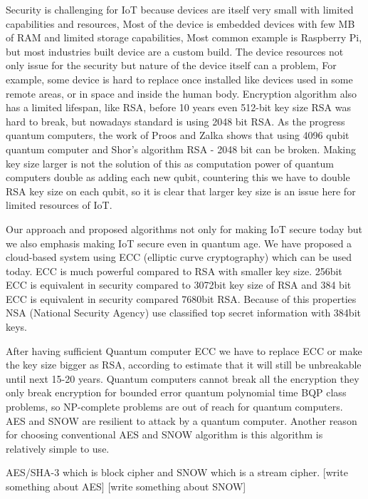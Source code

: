 \documentclass[preprint,12pt,5p]{elsarticle}
\begin{document}
Security is challenging for IoT because devices are itself very small with limited capabilities and resources, Most of the device is embedded devices with few MB of RAM and limited storage capabilities, Most common example is Raspberry Pi, but most industries built device are a custom build. The device resources not only issue for the security but nature of the device itself can a problem, For example, some device is hard to replace once installed like devices used in some remote areas, or in space and inside the human body. Encryption algorithm also has a limited lifespan, like RSA, before 10 years even 512-bit key size RSA was hard to break, but nowadays standard is using 2048 bit RSA. As the progress quantum computers, the work of Proos and Zalka shows that using 4096 qubit quantum computer and Shor's algorithm RSA - 2048 bit can be broken. \cite{Beckman1996}
Making key size larger is not the solution of this as computation power of quantum computers double as adding each new qubit, countering this we have to double RSA key size on each qubit, so it is clear that larger key size is an issue here for limited resources of IoT.

Our approach and proposed algorithms not only for making IoT secure today but we also emphasis making IoT secure even in quantum age. We have proposed a cloud-based system using ECC (elliptic curve cryptography) which can be used today. ECC is much powerful compared to RSA with smaller key size. 256bit ECC is equivalent in security compared to 3072bit key size of RSA and 384 bit ECC is equivalent in security compared  7680bit RSA. Because of this properties NSA (National Security Agency) use classified top secret information with 384bit keys. 

After having sufficient Quantum computer ECC we have to replace ECC or make the key size bigger as RSA, according to estimate that it will still be unbreakable until next 15-20 years. Quantum computers cannot break all the encryption they only break encryption for bounded error quantum polynomial time BQP class problems, so NP-complete problems are out of reach for quantum computers. AES and SNOW are resilient to attack by a quantum computer. Another reason for choosing conventional AES and SNOW algorithm is this algorithm is relatively simple to use.

AES/SHA-3  which is block cipher and SNOW which is a stream cipher. [write something about AES] [write something about SNOW]
\end{document}
